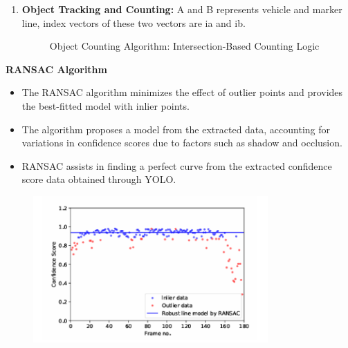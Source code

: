 {\begin{enumerate}
 \item \textbf{Object Tracking and Counting:} A and B represents vehicle and marker line, index vectors of these two vectors are ia and ib.
%
%
\begin{figure}[h!]
    \centering
    \caption{Object Counting Algorithm: Intersection-Based Counting Logic}
\end{figure}
%
%
\end{enumerate}
%
%
\textbf{RANSAC Algorithm}
\begin{itemize}
    \item The RANSAC algorithm minimizes the effect of outlier points and provides the best-fitted model with inlier points.
    \item The algorithm proposes a model from the extracted data, accounting for variations in confidence scores due to factors such as shadow and occlusion.
    \item RANSAC assists in finding a perfect curve from the extracted confidence score data obtained through YOLO.
\end{itemize}
%
%
\begin{figure}[h!]
    \centering
    \includegraphics[width=0.8\textwidth]{images/RANSAC Outlier Rejection.png}

\end{figure}}
